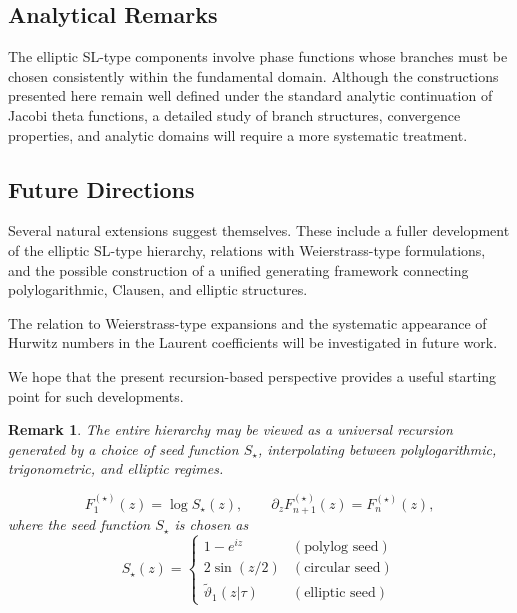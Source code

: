 \documentclass[11pt]{article}
\newtheorem{remark}{Remark}
\begin{document}
\subsection{Analytical Remarks}

The elliptic SL-type components involve phase functions
whose branches must be chosen consistently within the
fundamental domain.
Although the constructions presented here remain well
defined under the standard analytic continuation of
Jacobi theta functions, a detailed study of branch
structures, convergence properties, and analytic domains
will require a more systematic treatment.


\subsection{Future Directions}

Several natural extensions suggest themselves.
These include a fuller development of the elliptic
SL-type hierarchy, relations with Weierstrass-type
formulations, and the possible construction of a unified
generating framework connecting polylogarithmic,
Clausen, and elliptic structures.

The relation to Weierstrass-type expansions and the systematic appearance of Hurwitz numbers in the Laurent coefficients will be investigated in future work.

We hope that the present recursion-based perspective
provides a useful starting point for such developments.

\begin{remark}
The entire hierarchy may be viewed as a universal recursion generated by a choice of seed function $S_{\star}$, interpolating between polylogarithmic, trigonometric, and elliptic regimes. 

\[
F^{(\star)}_1(z)
=
\log S_{\star}(z),
\qquad
\partial_z F^{(\star)}_{n+1}(z)=F^{(\star)}_n(z),
\]
where the seed function $S_{\star}$ is chosen as
\[
S_\star(z)
=
\begin{cases}
1-e^{iz} & (\text{polylog seed})\\[4pt]
2\sin(z/2) & (\text{circular seed})\\[4pt]
\widetilde{\vartheta}_1(z|\tau) & (\text{elliptic seed})
\end{cases}
\]
\end{remark}


\end{document}
